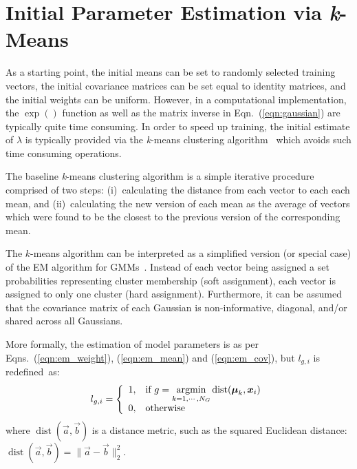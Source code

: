 \section{Initial Parameter Estimation via {\it k}-Means}
\label{sec:param_km}

As a starting point, the initial means can be set to randomly selected training vectors,
the initial covariance matrices can be set equal to identity matrices, 
and the initial weights can be uniform.
However, in a computational implementation, the $\exp()$ function as well as the matrix inverse in Eqn.~(\ref{eqn:gaussian}) are typically quite time consuming.
In order to speed up training, the initial estimate of $\lambda$ is typically provided via the {\it k}-means clustering algorithm~\cite{Bishop_2006,Duda01,Kulis_2012}
which avoids such time consuming operations.

The baseline {\it k}-means clustering algorithm is a simple iterative procedure comprised of two steps:
(i)~calculating the distance from each vector to each each mean,
and
(ii)~calculating the new version of each mean as the average of vectors which were found to be the closest to the previous version of the corresponding mean.


The $k$-means algorithm can be interpreted as a simplified version (or special case) of the EM algorithm for GMMs~\cite{Kulis_2012}.
Instead of each vector being assigned a set probabilities representing cluster membership (soft assignment),
each vector is assigned to only one cluster (hard assignment).
Furthermore, it can be assumed that the covariance matrix of each Gaussian is non-informative, diagonal, and/or shared across all Gaussians.

More formally, the estimation of model parameters is as per Eqns.~(\ref{eqn:em_weight}), (\ref{eqn:em_mean}) and (\ref{eqn:em_cov}), 
but $l_{g,i}$ is redefined~as:%
%
\begin{equation}
  l_{g,i} = \left\{
  \begin{array}{ll}
  1, & \mbox{if} ~ g = \operatorname*{argmin}\limits_{k=1, \cdots, N_G} \operatorname{dist}({\boldsymbol{\mu}}_k, {\boldsymbol{x}}_i) \\
  0, & \mbox{otherwise}
  \end{array}
  \right.
\end{equation}
%
where {$\operatorname{dist}(\Vec{a}, \Vec{b})$} is a distance metric,
such as the squared Euclidean distance: \mbox{$\operatorname{dist}(\Vec{a}, \Vec{b}) = \| \Vec{a} - \Vec{b} \|^{2}_{2}$}.

